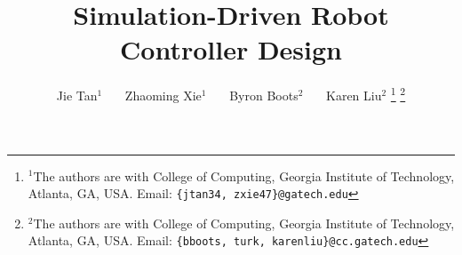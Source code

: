 \documentclass[letterpaper, 10 pt, conference]{ieeeconf}  %
\title{\LARGE \bf
Simulation-Driven Robot Controller Design
}
\author{Jie Tan$^{1}$ ~~~Zhaoming Xie$^{1}$ ~~~Byron Boots$^{2}$ ~~~Karen Liu$^{2}$%
\thanks{$^{1}$The authors are with College of Computing, Georgia Institute of Technology, Atlanta, GA, USA. Email:
        {\tt\small \{jtan34, zxie47\}@gatech.edu}}%
\thanks{$^{2}$The authors are with College of Computing, Georgia Institute of Technology, Atlanta, GA, USA. Email:
        {\tt\small \{bboots, turk, karenliu\}@cc.gatech.edu}}%
}
\begin{document}
\maketitle
\thispagestyle{empty}
\pagestyle{empty}


\begin{abstract}

\end{abstract}











\appendix

\end{document}
